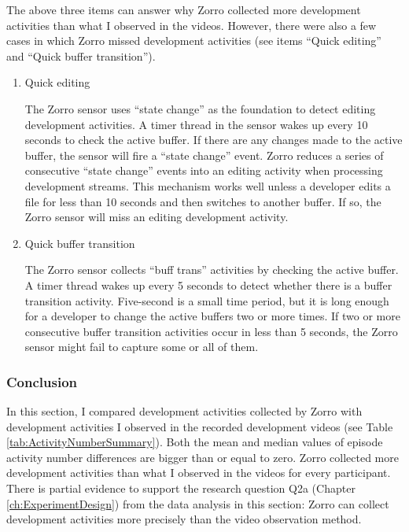 The above three items can answer why Zorro collected more development 
activities than what I observed in the videos. However, there
were also a few cases in which Zorro missed development activities (see 
items ``Quick editing'' and ``Quick buffer transition'').
\begin{enumerate}
 
  \item Quick editing
  
  The Zorro sensor uses ``state change'' as the foundation to detect
  editing development activities. A timer thread in the sensor wakes up every 10
  seconds to check the active buffer. If there are any changes made to
  the active buffer, the sensor will fire a ``state change'' event. Zorro
  reduces a series of consecutive ``state change'' events into an
  editing activity when processing development streams. This
  mechanism works well unless a developer edits a file for
  less than 10 seconds and then switches to another buffer. If so, the
  Zorro sensor will miss an editing development activity.

  \item Quick buffer transition
  
  The Zorro sensor collects ``buff trans'' activities by checking the
  active buffer.  A timer thread wakes up every 5 seconds to detect
  whether there is a buffer transition activity. Five-second is a
  small time period, but it is long enough for a developer to change
  the active buffers two or more times. If two or more consecutive buffer
  transition activities occur in less than 5 seconds, the Zorro sensor
  might fail to capture some or all of them.
   
\end{enumerate}        

\subsubsection{Conclusion}
In this section, I compared development activities collected by
Zorro with development activities I observed in the recorded 
development videos (see Table \ref{tab:ActivityNumberSummary}). 
Both the mean and median values of episode activity number differences 
are bigger than or equal to zero. Zorro collected more development 
activities than what I observed in the videos for every participant. 
There is partial evidence to support the research question Q2a 
(Chapter \ref{ch:ExperimentDesign}) from the data analysis in 
this section: Zorro can collect development activities more 
precisely than the video observation method.


